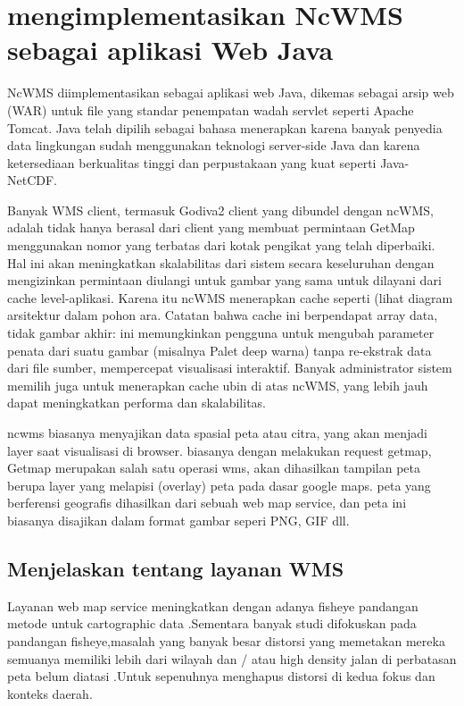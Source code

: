 \section{mengimplementasikan NcWMS sebagai aplikasi Web Java}
NcWMS diimplementasikan sebagai aplikasi web Java, dikemas sebagai arsip web (WAR) untuk file yang standar penempatan wadah servlet
seperti Apache Tomcat. Java telah dipilih sebagai bahasa menerapkan karena banyak penyedia data lingkungan sudah menggunakan teknologi
server-side Java dan karena ketersediaan berkualitas tinggi dan perpustakaan yang kuat seperti Java-NetCDF.

Banyak WMS client, termasuk Godiva2 client yang dibundel dengan ncWMS, adalah tidak hanya berasal dari client yang membuat permintaan
GetMap menggunakan nomor yang terbatas dari kotak pengikat yang telah diperbaiki. Hal ini akan meningkatkan skalabilitas dari sistem
secara keseluruhan dengan mengizinkan permintaan diulangi untuk gambar yang sama untuk dilayani dari cache level-aplikasi. Karena itu
ncWMS menerapkan cache seperti (lihat diagram arsitektur dalam pohon ara.  Catatan bahwa cache ini berpendapat array data, tidak gambar
akhir: ini memungkinkan pengguna untuk mengubah parameter penata dari suatu gambar (misalnya Palet deep warna) tanpa re-ekstrak data
dari file sumber, mempercepat visualisasi interaktif. Banyak administrator sistem memilih juga untuk menerapkan cache ubin di atas
ncWMS, yang lebih jauh dapat meningkatkan performa dan skalabilitas.

ncwms biasanya menyajikan data spasial peta atau citra, yang akan menjadi layer saat visualisasi di browser.
biasanya dengan melakukan request getmap, Getmap merupakan salah satu operasi wms, akan dihasilkan tampilan peta berupa layer yang
melapisi (overlay) peta pada dasar google maps. peta yang berferensi geografis dihasilkan dari sebuah web map service, dan peta ini
biasanya disajikan dalam format gambar seperi PNG, GIF dll.

\subsection{Menjelaskan tentang layanan WMS}
Layanan web map service  meningkatkan dengan  adanya fisheye pandangan metode untuk cartographic data .Sementara banyak studi difokuskan
pada pandangan fisheye,masalah yang banyak besar distorsi yang memetakan mereka semuanya memiliki lebih dari wilayah dan / atau high
density jalan di perbatasan peta belum diatasi .Untuk sepenuhnya menghapus distorsi di kedua fokus dan konteks daerah.

